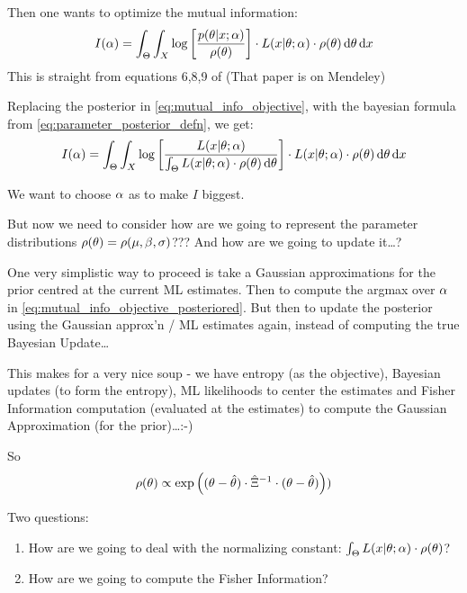 \documentclass{article}
\begin{document}
Then one wants to optimize the mutual information:
\begin{equation}
I({\alpha}) = \int_\Theta \int_X  \log\left[\frac{p({\theta}| x; {\alpha})}{\rho({\theta})}\right]
\cdot L(x| {\theta};{\alpha}) \cdot \rho({\theta}) \, \mathrm{d} {\theta} \, \mathrm{d} x
\label{eq:mutual_info_objective}
\end{equation}
This is straight from equations 6,8,9 of \cite{Myung2013} (That paper is on
Mendeley)
 
Replacing the posterior in \cref{eq:mutual_info_objective}, with the bayesian
formula from \cref{eq:parameter_posterior_defn}, we get:
\begin{equation}
I({\alpha}) = \int_\Theta \int_X  \log\left[\frac{L(x|{\theta}; {\alpha})}
										{\int_\Theta L(x|{\theta};{\alpha})\cdot \rho({\theta}) \, \mathrm{d} {\theta}} \right] \cdot L(x|
										{\theta};{\alpha}) \cdot \rho({\theta}) \, \mathrm{d} {\theta} \, \mathrm{d} x
\label{eq:mutual_info_objective_posteriored}
\end{equation}

We want to choose ${\alpha}$ as to make $I$ biggest. 

But now we need to consider how are we going to represent the parameter
distributions 
$\rho({\theta}) = \rho({\mu },{\beta},{\sigma })$???
And how are we going to update it\ldots?

One very simplistic way to proceed is take a Gaussian approximations for the
prior centred at the current ML estimates. Then to compute the argmax over ${\alpha}$
in \cref{eq:mutual_info_objective_posteriored}. But then to update the posterior using
the Gaussian approx'n / ML estimates again, instead of computing the true Bayesian
Update\ldots

This makes for a very nice soup - we have entropy (as the objective), Bayesian
updates (to form the entropy), ML likelihoods to center the estimates and Fisher
Information computation (evaluated at the estimates) to compute the Gaussian
Approximation (for the prior)\ldots:-)

So  
\begin{equation}
\rho({\theta}) \propto 
\exp\left( ({\theta} - \hat{{\theta}}) \cdot \hat\Xi^{-1} \cdot ({\theta}-\hat{{\theta}})\right))
\label{eq:prior_gaussian_approxmn}
\end{equation}

Two questions:
\begin{enumerate}
 \item 
 How are we going to deal with the normalizing constant: ${\int_\Theta
 L(x|{\theta};{\alpha})\cdot \rho({\theta})}$?
\item How are we going to compute the Fisher Information? 
\end{enumerate}
\end{document}
